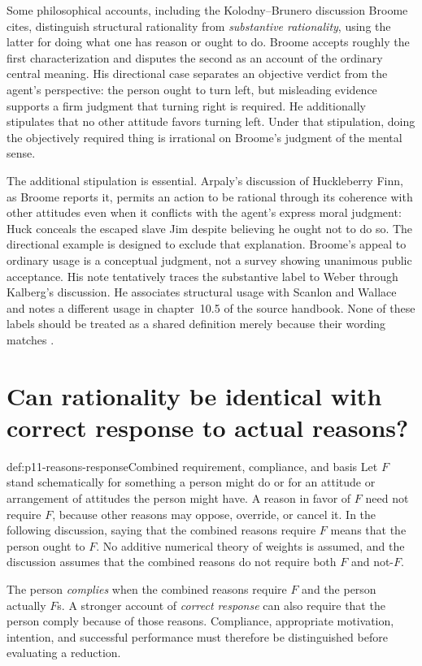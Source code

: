 Some philosophical accounts, including the Kolodny--Brunero discussion
Broome cites, distinguish structural rationality from
\emph{substantive rationality}, using the latter for doing what one has reason
or ought to do. Broome accepts roughly the first characterization and disputes
the second as an account of the ordinary central meaning. His directional
case separates an objective verdict from the agent's perspective: the person
ought to turn left, but misleading evidence supports a firm judgment that
turning right is required. He additionally stipulates that no other attitude
favors turning left. Under that stipulation, doing the objectively required
thing is irrational on Broome's judgment of the mental sense.

The additional stipulation is essential. Arpaly's discussion of Huckleberry
Finn, as Broome reports it, permits an action to be rational through its
coherence with other attitudes even when it conflicts with the agent's
express moral judgment: Huck conceals the escaped slave Jim despite believing
he ought not to do so. The directional example is designed to exclude that
explanation. Broome's appeal to ordinary usage is a conceptual judgment,
not a survey showing unanimous public acceptance. His note tentatively
traces the substantive label to Weber through Kalberg's discussion. He
associates structural usage with Scanlon and Wallace and notes a different
usage in chapter~10.5 of the source handbook. None of these labels should
be treated as a shared definition merely because their wording matches
\parencite[p.~131 and p.~135, nn.~3--5]{Broome2021ReasonsRationality}.

\section{Can rationality be identical with correct response to actual reasons?}
\label{sec:p11-reasons-identity}

\begin{hbdefinition}{def:p11-reasons-response}{Combined requirement, compliance, and basis}
Let \(F\) stand schematically for something a person might do or for an
attitude or arrangement of attitudes the person might have. A reason in favor
of \(F\) need not require \(F\), because other reasons may oppose, override,
or cancel it. In the following discussion, saying that the combined reasons
require \(F\) means that the person ought to \(F\). No additive numerical
theory of weights is assumed, and the discussion assumes that the combined
reasons do not require both \(F\) and not-\(F\).

The person \emph{complies} when the combined reasons require \(F\) and the
person actually \(F\)s. A stronger account of \emph{correct response} can also
require that the person comply because of those reasons. Compliance,
appropriate motivation, intention, and successful performance must therefore
be distinguished before evaluating a reduction.
\end{hbdefinition}

